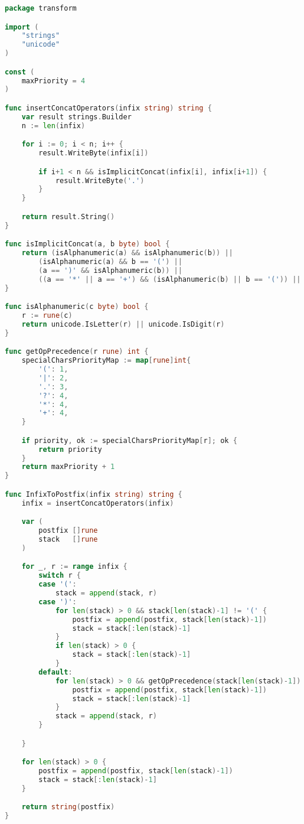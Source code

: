 \begin{lstlisting}[language=Go, caption={Код модуля \textit{transform}}, label=lst2]
package transform

import (
	"strings"
	"unicode"
)

const (
	maxPriority = 4
)

func insertConcatOperators(infix string) string {
	var result strings.Builder
	n := len(infix)

	for i := 0; i < n; i++ {
		result.WriteByte(infix[i])

		if i+1 < n && isImplicitConcat(infix[i], infix[i+1]) {
			result.WriteByte('.')
		}
	}

	return result.String()
}

func isImplicitConcat(a, b byte) bool {
	return (isAlphanumeric(a) && isAlphanumeric(b)) ||
		(isAlphanumeric(a) && b == '(') ||
		(a == ')' && isAlphanumeric(b)) ||
		((a == '*' || a == '+') && (isAlphanumeric(b) || b == '(')) || (a == ')' && b == '(')
}

func isAlphanumeric(c byte) bool {
	r := rune(c)
	return unicode.IsLetter(r) || unicode.IsDigit(r)
}

func getOpPrecedence(r rune) int {
	specialCharsPriorityMap := map[rune]int{
		'(': 1,
		'|': 2,
		'.': 3,
		'?': 4,
		'*': 4,
		'+': 4,
	}

	if priority, ok := specialCharsPriorityMap[r]; ok {
		return priority
	}
	return maxPriority + 1
}

func InfixToPostfix(infix string) string {
	infix = insertConcatOperators(infix)

	var (
		postfix []rune
		stack   []rune
	)

	for _, r := range infix {
		switch r {
		case '(':
			stack = append(stack, r)
		case ')':
			for len(stack) > 0 && stack[len(stack)-1] != '(' {
				postfix = append(postfix, stack[len(stack)-1])
				stack = stack[:len(stack)-1]
			}
			if len(stack) > 0 {
				stack = stack[:len(stack)-1]
			}
		default:
			for len(stack) > 0 && getOpPrecedence(stack[len(stack)-1]) >= getOpPrecedence(r) {
				postfix = append(postfix, stack[len(stack)-1])
				stack = stack[:len(stack)-1]
			}
			stack = append(stack, r)
		}

	}

	for len(stack) > 0 {
		postfix = append(postfix, stack[len(stack)-1])
		stack = stack[:len(stack)-1]
	}

	return string(postfix)
}
\end{lstlisting}


\newpage